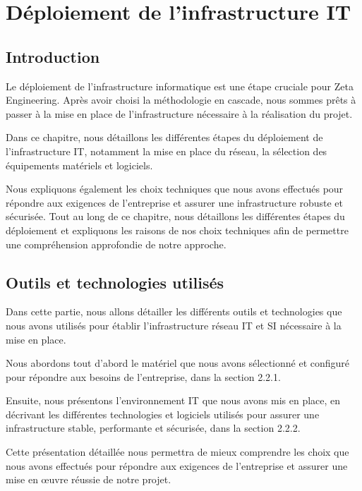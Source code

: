 \chapter{Déploiement de l'infrastructure IT}



\section{Introduction}

Le déploiement de l'infrastructure informatique est une étape cruciale pour  Zeta Engineering. Après avoir choisi la méthodologie en cascade, nous sommes prêts à passer à la mise en place de l'infrastructure nécessaire à la réalisation du projet.

Dans ce chapitre, nous détaillons les différentes étapes du déploiement de l'infrastructure IT, notamment la mise en place du réseau, la sélection des équipements matériels et logiciels.

Nous expliquons également les choix techniques que nous avons effectués pour répondre aux exigences de l'entreprise et assurer une infrastructure robuste et sécurisée. Tout au long de ce chapitre, nous détaillons les différentes étapes du déploiement et expliquons les raisons de nos choix techniques afin de permettre une compréhension approfondie de notre approche.




\section{Outils et technologies utilisés}

Dans cette partie, nous allons détailler les différents outils et technologies que nous avons utilisés pour établir l'infrastructure réseau IT et SI nécessaire à la mise en place.

Nous abordons tout d'abord le matériel que nous avons sélectionné et configuré pour répondre aux besoins de l'entreprise, dans la section 2.2.1.

Ensuite, nous présentons l'environnement IT que nous avons mis en place, en décrivant les différentes technologies et logiciels utilisés pour assurer une infrastructure stable, performante et sécurisée, dans la section 2.2.2.

Cette présentation détaillée nous permettra de mieux comprendre les choix que nous avons effectués pour répondre aux exigences de l'entreprise et assurer une mise en œuvre réussie de notre projet.

